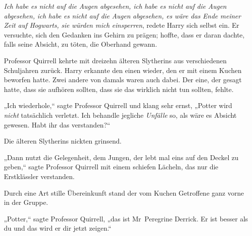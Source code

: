 \emph{Ich habe es nicht auf die Augen abgesehen, ich habe es nicht auf die Augen abgesehen, ich habe es nicht auf die Augen abgesehen, es wäre das Ende meiner Zeit auf Hogwarts, sie würden mich einsperren}, redete Harry sich selbst ein. Er versuchte, sich den Gedanken ins Gehirn zu prägen; hoffte, dass er daran dachte, falls seine Absicht, zu töten, die Oberhand gewann.

Professor Quirrell kehrte mit dreizehn älteren Slytherins aus verschiedenen Schuljahren zurück. Harry erkannte den einen wieder, den er mit einem Kuchen beworfen hatte. Zwei andere von damals waren auch dabei. Der eine, der gesagt hatte, dass sie aufhören sollten, dass sie das wirklich nicht tun sollten, fehlte.

„Ich wiederhole,“ sagte Professor Quirrell und klang sehr ernst, „Potter wird \emph{nicht} tatsächlich verletzt. Ich behandle jegliche \emph{Unfälle} so, als wäre es Absicht gewesen. Habt ihr das verstanden?“

Die älteren Slytherins nickten grinsend.

„Dann nutzt die Gelegenheit, dem Jungen, der lebt mal eins auf den Deckel zu geben,“ sagte Professor Quirrell mit einem schiefen Lächeln, das nur die Erstklässler verstanden.

Durch eine Art stille Übereinkunft stand der vom Kuchen Getroffene ganz vorne in der Gruppe.

„Potter,“ sagte Professor Quirrell, „das ist Mr~Peregrine Derrick. Er ist besser als du und das wird er dir jetzt zeigen.“

